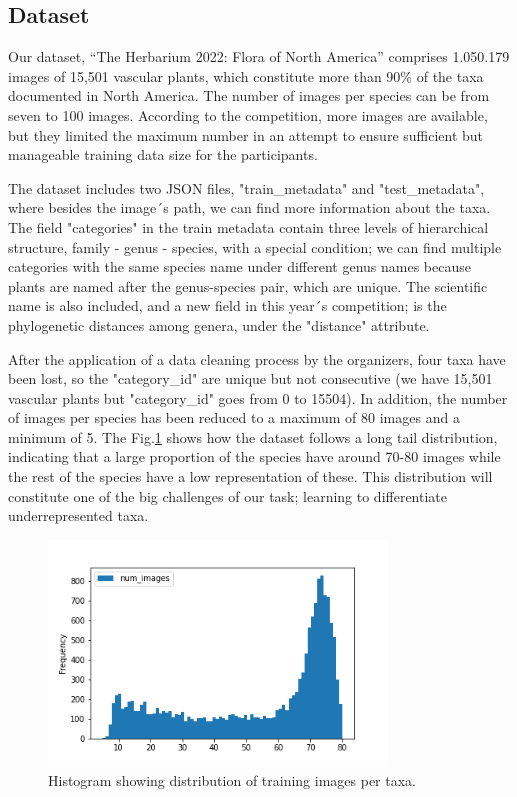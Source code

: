 \documentclass{article}
\begin{document}
\subsection{Dataset}
Our dataset, “The Herbarium 2022: Flora of North America” comprises 1.050.179 images of 15,501 vascular plants, which constitute more than 90\% of the taxa documented in North America. The number of images per species can be from seven to 100 images. According to the competition, more images are available, but they limited the maximum number in an attempt to ensure sufficient but manageable training data size for the participants.

The dataset includes two JSON files, "train\_metadata" and "test\_metadata", where besides the image´s path, we can find more information about the taxa. The field "categories" in the train metadata contain three levels of hierarchical structure, family - genus - species, with a special condition; we can find multiple categories with the same species name under different genus names because plants are named after the genus-species pair, which are unique. The scientific name is also included, and a new field in this year´s competition; is the phylogenetic distances among genera, under the "distance" attribute.

After the application of a data cleaning process by the organizers, four taxa have been lost, so the "category\_id" are unique but not consecutive (we have 15,501 vascular plants but "category\_id" goes from 0 to 15504). In addition, the number of images per species has been reduced to a maximum of 80 images and a minimum of 5. The  Fig.\ref{fig:long_tail} shows how the dataset follows a long tail distribution, indicating that a large proportion of the species have around 70-80 images while the rest of the species have a low representation of these. This distribution will constitute one of the big challenges of our task; learning to differentiate underrepresented taxa.

\begin{figure}[h]
    \centering
    \includegraphics[width=9cm]{long_tail}
    \caption{Histogram showing distribution of training images per taxa.}
    \label{fig:long_tail}

\end{figure}
\end{document}
